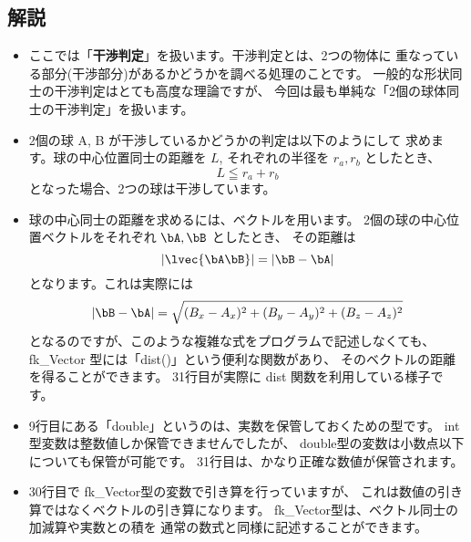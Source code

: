 \subsection*{解説}
\begin{itemize}
 \item ここでは「\textbf{干渉判定}」を扱います。干渉判定とは、2つの物体に
	重なっている部分(干渉部分)があるかどうかを調べる処理のことです。
	一般的な形状同士の干渉判定はとても高度な理論ですが、
	今回は最も単純な「2個の球体同士の干渉判定」を扱います。

 \item 2個の球 A, B が干渉しているかどうかの判定は以下のようにして
	求めます。球の中心位置同士の距離を \(L\),
	それぞれの半径を \(r_a, r_b\) としたとき、
	\begin{equation}
		L \leqq r_a + r_b
	\end{equation}
	となった場合、2つの球は干渉しています。

 \item 球の中心同士の距離を求めるには、ベクトルを用います。
	2個の球の中心位置ベクトルをそれぞれ \(\bA, \bB\) としたとき、
	その距離は
	\begin{equation}
	|\lvec{\bA\bB}| = |\bB - \bA|
	\end{equation}
	となります。これは実際には
	\begin{equation}
	|\bB - \bA| = \sqrt{(B_x - A_x)^2 + (B_y - A_y)^2 + (B_z - A_z)^2}
	\end{equation}
	となるのですが、このような複雑な式をプログラムで記述しなくても、
	fk\_Vector 型には「dist()」という便利な関数があり、
	そのベクトルの距離を得ることができます。
	31行目が実際に dist 関数を利用している様子です。

 \item 9行目にある「double」というのは、実数を保管しておくための型です。
	int型変数は整数値しか保管できませんでしたが、
	double型の変数は小数点以下についても保管が可能です。
	31行目は、かなり正確な数値が保管されます。

 \item 30行目で fk\_Vector型の変数で引き算を行っていますが、
	これは数値の引き算ではなくベクトルの引き算になります。
	fk\_Vector型は、ベクトル同士の加減算や実数との積を
	通常の数式と同様に記述することができます。

\end{itemize}

